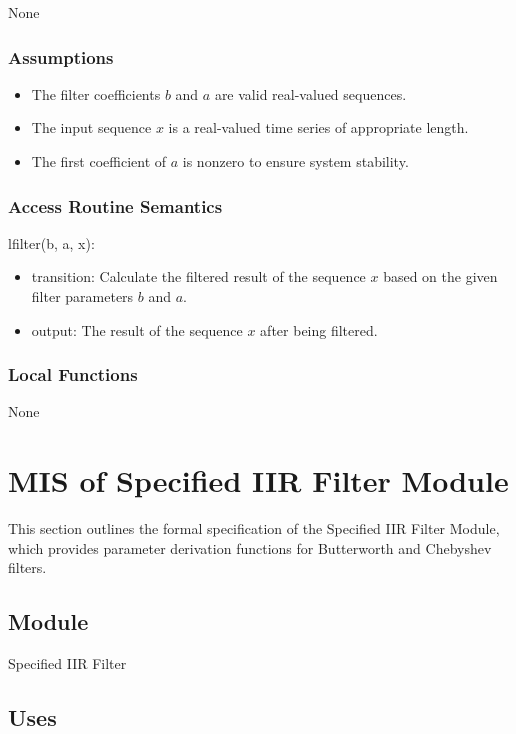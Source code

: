 \documentclass[12pt, titlepage]{article}
\begin{document}
None

\subsubsection{Assumptions}

\begin{itemize}
\item The filter coefficients $b$ and $a$ are valid real-valued sequences.
\item The input sequence $x$ is a real-valued time series of appropriate length.
\item The first coefficient of $a$ is nonzero to ensure system stability.
\end{itemize}

\subsubsection{Access Routine Semantics}

\noindent lfilter(b, a, x):
\begin{itemize}
\item transition: Calculate the filtered result of the sequence $x$ based on the
given filter parameters $b$ and $a$.
\item output: The result of the sequence $x$ after being filtered.
\end{itemize}

\subsubsection{Local Functions}

None

\newpage

\section{MIS of Specified IIR Filter Module} \label{MIS_SIIR}

This section outlines the formal specification of the Specified IIR Filter
Module, which provides parameter derivation functions for Butterworth and
Chebyshev filters.

\subsection{Module}

Specified IIR Filter

\subsection{Uses}
\end{document}
